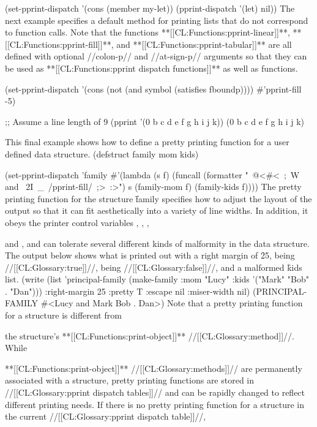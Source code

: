  (set-pprint-dispatch '(cons (member my-let)) 
                      (pprint-dispatch '(let) nil)) \endcode
  The next example specifies a default method for printing lists that do not correspond to function calls.  Note that the functions **[[CL:Functions:pprint-linear]]**, **[[CL:Functions:pprint-fill]]**, and **[[CL:Functions:pprint-tabular]]** are all defined with optional //colon-p// and //at-sign-p// arguments so that they can  be used as **[[CL:Functions:pprint dispatch functions]]** as well as   functions.

\code
 (set-pprint-dispatch '(cons (not (and symbol (satisfies fboundp))))
                      #'pprint-fill -5)
 
 ;; Assume a line length of 9
 (pprint '(0 b c d e f g h i j k))
 (0 b c d
  e f g h
  i j k) \endcode 

This final example shows how to define a pretty printing function for a user defined data structure.
  \code
 (defstruct family mom kids)
 
 (set-pprint-dispatch 'family
   #'(lambda (s f)
       (funcall (formatter "~@<#<~;~W and ~2I~_~/pprint-fill/~;>~:>")
               s (family-mom f) (family-kids f)))) \endcode
  The pretty printing function for the structure \f{family} specifies how to adjust the layout of the output so that it can fit aesthetically into a variety of line widths.  In addition, it obeys  the printer control variables , , , 

and , and can tolerate several different kinds of malformity in the data structure. The output below shows what is printed out with a right margin of \f{25},  being //[[CL:Glossary:true]]//,  being //[[CL:Glossary:false]]//, and a malformed \f{kids} list.
  \code
 (write (list 'principal-family
              (make-family :mom "Lucy"
                           :kids '("Mark" "Bob" . "Dan")))
        :right-margin 25 :pretty T :escape nil :miser-width nil)
 (PRINCIPAL-FAMILY
  #<Lucy and
      Mark Bob . Dan>) \endcode
    Note that a pretty printing function for a structure is different from

the structure's **[[CL:Functions:print-object]]** //[[CL:Glossary:method]]//. While

**[[CL:Functions:print-object]]** //[[CL:Glossary:methods]]// are permanently associated with a structure, pretty printing functions are stored in  //[[CL:Glossary:pprint dispatch tables]]// and can be rapidly changed to reflect  different printing needs.  If there is no pretty printing function for  a structure in the current //[[CL:Glossary:pprint dispatch table]]//,

